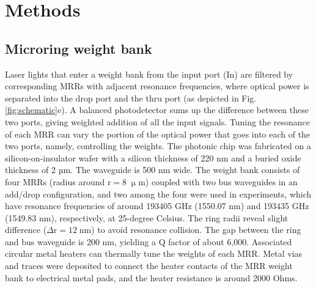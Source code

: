 \documentclass[pdflatex,mathphys]{sty}%
\begin{document}

\section{Methods}
\subsection{Microring weight bank}
Laser lights that enter a weight bank from the input port (In) are filtered by corresponding MRRs with adjacent resonance frequencies, where optical power is separated into the drop port and the thru port (as depicted in Fig. \ref{fig:schematic}e). A balanced photodetector sums up the difference between these two ports, giving weighted addition of all the input signals. Tuning the resonance of each MRR can vary the portion of the optical power that goes into each of the two ports, namely, controlling the weights. The photonic chip was fabricated on a silicon-on-insulator wafer with a silicon thickness of 220 nm and a buried oxide thickness of 2 µm. The waveguide is 500 nm wide. The weight bank consists of four MRRs (radius around $\textrm{r}=8\;\upmu\textrm{m}$) coupled with two bus waveguides in an add/drop configuration, and two among the four were used in experiments, which have resonance frequencies of around 193405 GHz (1550.07 nm) and 193435 GHz (1549.83 nm), respectively, at 25-degree Celsius. The ring radii reveal slight difference ($\Delta\textrm{r}=12\;\textrm{nm}$) to avoid resonance collision. The gap between the ring and bus waveguide is 200 nm, yielding a Q factor of about 6,000. Associated circular metal heaters can thermally tune the weights of each MRR. Metal vias and traces were deposited to connect the heater contacts of the MRR weight bank to electrical metal pads, and the heater resistance is around 2000 Ohms.
\end{document}
